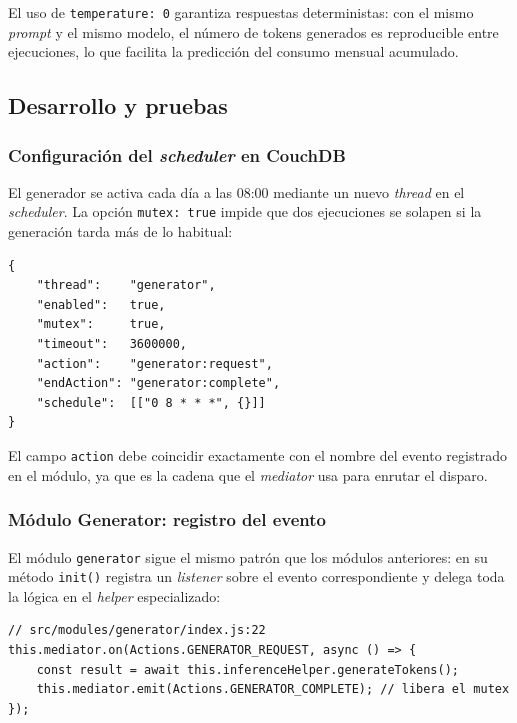 El uso de \texttt{temperature: 0} garantiza respuestas deterministas: con el mismo \textit{prompt} y el mismo modelo, el número de tokens generados es reproducible entre ejecuciones, lo que facilita la predicción del consumo mensual acumulado.

\subsection{Desarrollo y pruebas}

\subsubsection{Configuración del \textit{scheduler} en CouchDB}

El generador se activa cada día a las 08:00 mediante un nuevo \textit{thread} en el \textit{scheduler}. La opción \texttt{mutex: true} impide que dos ejecuciones se solapen si la generación tarda más de lo habitual:

\begin{lstlisting}[caption=Configuración del scheduler para el generador de tokens, label=lst:scheduler-generator]
{
    "thread":    "generator",
    "enabled":   true,
    "mutex":     true,
    "timeout":   3600000,
    "action":    "generator:request",
    "endAction": "generator:complete",
    "schedule":  [["0 8 * * *", {}]]
}
\end{lstlisting}

El campo \texttt{action} debe coincidir exactamente con el nombre del evento registrado en el módulo, ya que es la cadena que el \textit{mediator} usa para enrutar el disparo.

\subsubsection{Módulo Generator: registro del evento}

El módulo \texttt{generator} sigue el mismo patrón que los módulos anteriores: en su método \texttt{init()} registra un \textit{listener} sobre el evento correspondiente y delega toda la lógica en el \textit{helper} especializado:

\begin{lstlisting}[caption=Registro del evento en el módulo Generator, label=lst:generator-event]
// src/modules/generator/index.js:22
this.mediator.on(Actions.GENERATOR_REQUEST, async () => {
    const result = await this.inferenceHelper.generateTokens();
    this.mediator.emit(Actions.GENERATOR_COMPLETE); // libera el mutex
});
\end{lstlisting}

